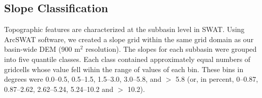 \subsection{Slope Classification}\label{sec:slope}

Topographic features are characterized at the subbasin level in SWAT. Using ArcSWAT software, we created a slope grid within the same grid domain as our basin-wide DEM (900 m$^2$ resolution). The slopes for each subbasin were grouped into five quantile classes. Each class contained approximately equal numbers of gridcells whose value fell wihin the range of values of each bin. These bins in degrees were 0.0--0.5, 0.5--1.5, 1.5--3.0, 3.0--5.8, and $>$ 5.8 (or, in percent, 0--0.87, 0.87--2.62, 2.62--5.24, 5.24--10.2 and $>$ 10.2).